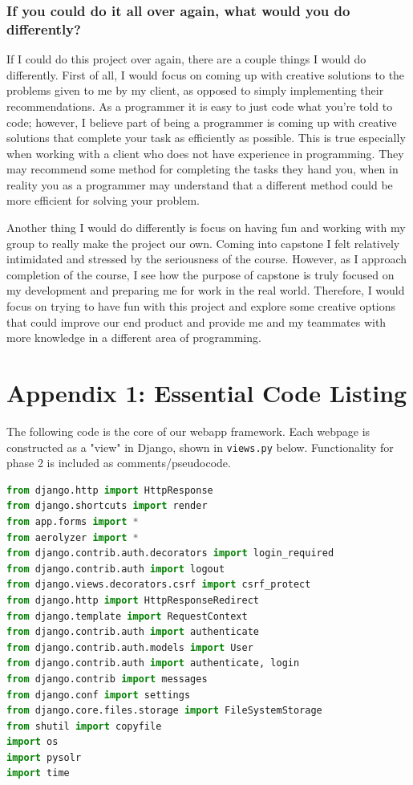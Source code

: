 \documentclass[onecolumn, draftclsnofoot,10pt, compsoc]{IEEEtran}
\begin{document}
\begin{flushleft}
\subsubsection{If you could do it all over again, what would you do differently?}
If I could do this project over again, there are a couple things I would do differently. First of all, I would focus on coming up with creative solutions to the problems given to me by my client, as opposed to simply implementing their recommendations. As a programmer it is easy to just code what you're told to code; however, I believe part of being a programmer is coming up with creative solutions that complete your task as efficiently as possible. This is true especially when working with a client who does not have experience in programming. They may recommend some method for completing the tasks they hand you, when in reality you as a programmer may understand that a different method could be more efficient for solving your problem.
 
Another thing I would do differently is focus on having fun and working with my group to really make the project our own. Coming into capstone I felt relatively intimidated and stressed by the seriousness of the course. However, as I approach completion of the course, I see how the purpose of capstone is truly focused on my development and preparing me for work in the real world. Therefore, I would focus on trying to have fun with this project and explore some creative options that could improve our end product and provide me and my teammates with more knowledge in a different area of programming.
 
\section{Appendix 1: Essential Code Listing} \label{appendix}
The following code is the core of our webapp framework. Each webpage is constructed as a "view" in Django, shown in \texttt{views.py} below. Functionality for phase 2 is included as comments/pseudocode.
\begin{lstlisting}[language=python]
from django.http import HttpResponse
from django.shortcuts import render
from app.forms import *
from aerolyzer import *
from django.contrib.auth.decorators import login_required
from django.contrib.auth import logout
from django.views.decorators.csrf import csrf_protect
from django.http import HttpResponseRedirect
from django.template import RequestContext
from django.contrib.auth import authenticate
from django.contrib.auth.models import User
from django.contrib.auth import authenticate, login
from django.contrib import messages
from django.conf import settings
from django.core.files.storage import FileSystemStorage
from shutil import copyfile
import os
import pysolr
import time
 

\end{lstlisting}
\end{flushleft}
\end{document}
